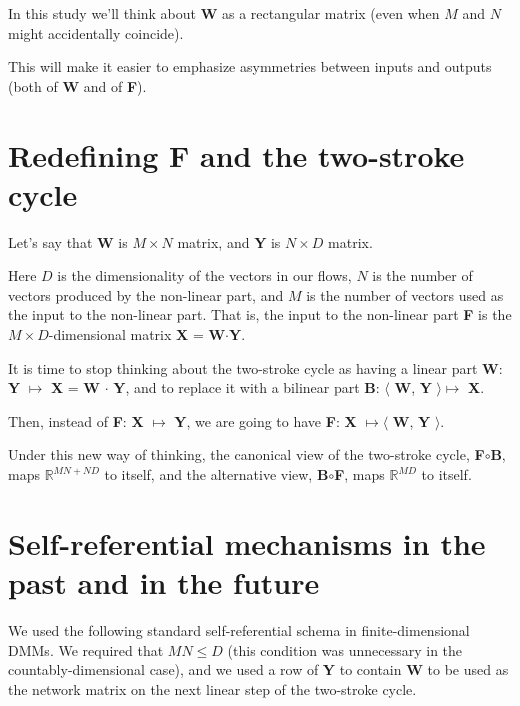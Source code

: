 \documentclass{article}
\begin{document}
\bigskip

In this study we'll think about {\bf W} as a rectangular matrix (even when $M$ and $N$ might accidentally coincide).

\smallskip

This will make it easier to emphasize asymmetries between inputs and outputs (both of {\bf W} and of {\bf F}).

\section{Redefining {\bf F} and the two-stroke cycle}

Let's say that {\bf W} is $M\!\!\times\!\!N$ matrix, and {\bf Y} is $N\!\!\times\!\!D$ matrix. 

\smallskip

Here $D$ is the dimensionality of the vectors in our flows, $N$ is the number of vectors produced by the non-linear part, and $M$ is the number of vectors used as the input to the non-linear part. That is, the input to the non-linear part {\bf F} is the 
$M\!\!\times\!\!D$-dimensional matrix {\bf X} = {\bf W}$\cdot${\bf Y}.

\bigskip

It is time to stop thinking about the two-stroke cycle as having a linear part {\bf W}: {\bf Y} $\mapsto$ {\bf X} = {\bf W} $\cdot$ {\bf Y}, and to replace it with a bilinear part {\bf B}: $\langle\!\!$ {\bf W}, {\bf Y} $\!\!\rangle \mapsto$ {\bf X}.

\smallskip

Then, instead of {\bf F}: {\bf X} $\mapsto$ {\bf Y}, we are going to have {\bf F}: {\bf X} $\mapsto \langle\!\!$ {\bf W}, {\bf Y} $\!\!\rangle$.

\smallskip

Under this new way of thinking, the canonical view of the two-stroke cycle, {\bf F}$\circ${\bf B}, maps $\mathbb{R}^{MN+ND}$ to itself, and the alternative view, {\bf B}$\circ${\bf F}, maps $\mathbb{R}^{MD}$ to itself.

\section{Self-referential mechanisms in the past and in the future}

We used the following standard self-referential schema in finite-dimensional DMMs. We required that $MN \!\leq\! D$ (this
condition was unnecessary in the countably-dimensional case), and we used a row of {\bf Y} to contain {\bf W} to be used as
the network matrix on the next linear step of the two-stroke cycle.
\end{document}
